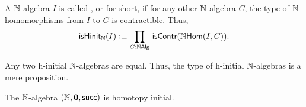 \documentclass[hott-all.tex]{subfiles}
\begin{document}
% 
\begin{defn}
  A $\mathbb{N}$-algebra $I$ is called ,
  or 
  for short, if for any other $\mathbb{N}$-algebra $C$, the type of $\mathbb{N}$-homomorphisms from $I$ to $C$ is contractible. Thus,
\begin{equation*}
\ishinitn(I) \defeq \prd{C : \nalg} \iscontr(\nhom(I,C)).
\end{equation*}
\end{defn}
% 
% 
\begin{thm}
  Any two h-initial $\mathbb{N}$-algebras are equal.
  Thus, the type of h-initial $\mathbb{N}$-algebras is a mere proposition.
\end{thm}
% 
% 
\begin{thm}
The $\mathbb{N}$-algebra $(\mathbb{N}, \mathbf{0}, \mathsf{succ})$ is homotopy initial.
\end{thm}
\end{document}
